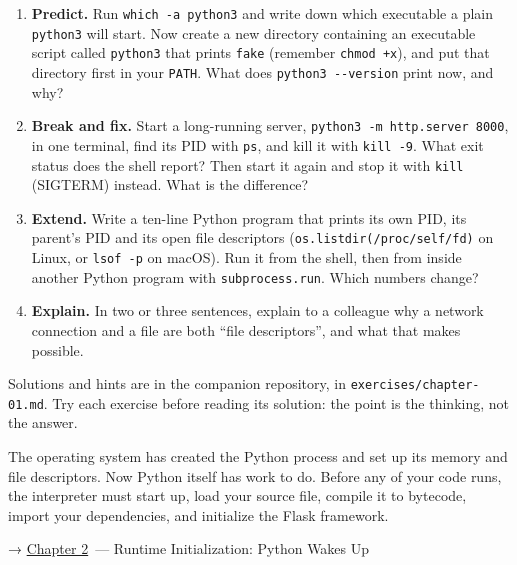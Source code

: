\begin{enumerate}
\def\labelenumi{\arabic{enumi}.}
\tightlist
\item
  \textbf{Predict.} Run \texttt{which\ -a\ python3} and write down which executable a plain \texttt{python3} will start. Now create a new directory containing an executable script called \texttt{python3} that prints \texttt{fake} (remember \texttt{chmod\ +x}), and put that directory first in your \texttt{PATH}. What does \texttt{python3\ -\/-version} print now, and why?
\item
  \textbf{Break and fix.} Start a long-running server, \texttt{python3\ -}\allowbreak{}\texttt{m\ http.}\allowbreak{}\texttt{server\ 8000}, in one terminal, find its PID with \texttt{ps}, and kill it with \texttt{kill\ -9}. What exit status does the shell report? Then start it again and stop it with \texttt{kill} (SIGTERM) instead. What is the difference?
\item
  \textbf{Extend.} Write a ten-line Python program that prints its own PID, its parent's PID and its open file descriptors (\texttt{os.}\allowbreak{}\texttt{listdir(\textquotesingle{}/}\allowbreak{}\texttt{proc/}\allowbreak{}\texttt{self/}\allowbreak{}\texttt{fd\textquotesingle{})} on Linux, or \texttt{lsof\ -p} on macOS). Run it from the shell, then from inside another Python program with \texttt{subprocess.run}. Which numbers change?
\item
  \textbf{Explain.} In two or three sentences, explain to a colleague why a network connection and a file are both ``file descriptors'', and what that makes possible.
\end{enumerate}

\noindent{}Solutions and hints are in the companion repository, in \texttt{exercises/}\allowbreak{}\texttt{chapter-01.md}. Try each exercise before reading its solution: the point is the thinking, not the answer.

\label{01-command-to-process:whats-next}

The operating system has created the Python process and set up its memory and file descriptors. Now Python itself has work to do. Before any of your code runs, the interpreter must start up, load your source file, compile it to bytecode, import your dependencies, and initialize the Flask framework.

\noindent{}→ \hyperref[ch:02-runtime-initialization]{Chapter 2}~--- Runtime Initialization: Python Wakes Up
